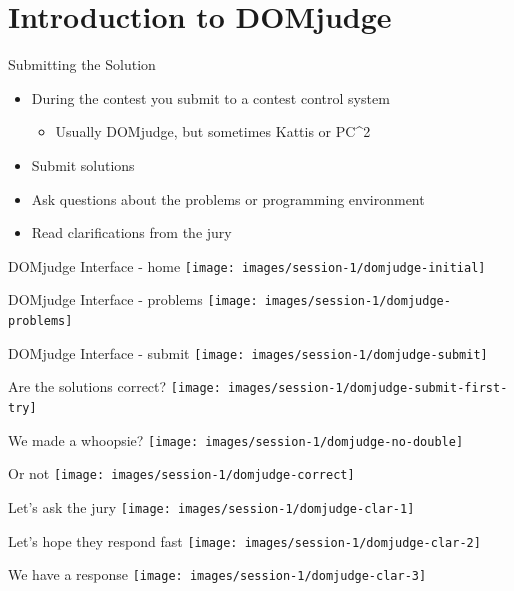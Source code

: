 \documentclass[11pt,pdf, aspectratio=169]{beamer}
\begin{document}
  \section{Introduction to DOMjudge}
  \begin{frame}{Submitting the Solution}
    \begin{itemize}
      \item During the contest you submit to a contest control system
      \begin{itemize}
        \item Usually DOMjudge, but sometimes Kattis or PC\textasciicircum2
      \end{itemize}
      \item Submit solutions
      \item Ask questions about the problems or programming environment
      \item Read clarifications from the jury
    \end{itemize}
  \end{frame}
  \begin{frame}{DOMjudge Interface - home}
    \texttt{[image: images/session-1/domjudge-initial]}
  \end{frame}
  \begin{frame}{DOMjudge Interface - problems}
    \texttt{[image: images/session-1/domjudge-problems]}
  \end{frame}
  \begin{frame}{DOMjudge Interface - submit}
    \texttt{[image: images/session-1/domjudge-submit]}
  \end{frame}
  \begin{frame}{Are the solutions correct?}
    \texttt{[image: images/session-1/domjudge-submit-first-try]}
  \end{frame}
  \begin{frame}{We made a whoopsie?}
    \texttt{[image: images/session-1/domjudge-no-double]}
  \end{frame}
  \begin{frame}{Or not}
    \texttt{[image: images/session-1/domjudge-correct]}
  \end{frame}
  \begin{frame}{Let's ask the jury}
    \texttt{[image: images/session-1/domjudge-clar-1]}
  \end{frame}
  \begin{frame}{Let's hope they respond fast}
    \texttt{[image: images/session-1/domjudge-clar-2]}
  \end{frame}
  \begin{frame}{We have a response}
    \texttt{[image: images/session-1/domjudge-clar-3]}
  \end{frame}
\end{document}
